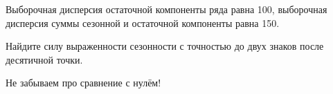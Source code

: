 
\begin{question}
Выборочная дисперсия остаточной компоненты ряда равна 100,
выборочная дисперсия суммы сезонной и остаточной компоненты равна 150.

Найдите силу выраженности сезонности с точностью до двух знаков после десятичной точки.
\end{question}

\begin{solution}
Не забываем про сравнение с нулём!
\end{solution}

